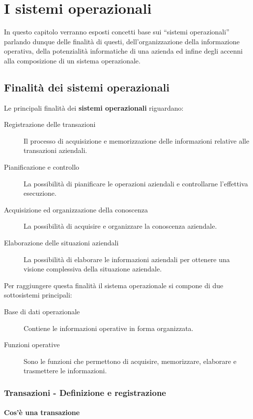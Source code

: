 \chapter{I sistemi operazionali}
\thispagestyle{chapterInit}
\label{ch:operazionali}
In questo capitolo verranno esposti concetti base sui ``sistemi operazionali'' parlando dunque delle finalità di questi, dell'organizzazione della informazione operativa, della potenzialità informatiche di una azienda ed infine degli accenni alla composizione di un sistema operazionale.

\section{Finalità dei sistemi operazionali}
    Le principali finalità dei \textbf{sistemi operazionali} riguardano:
    \begin{description}
        \item[Registrazione delle transazioni] Il processo di acquisizione e memorizzazione delle informazioni relative alle transazioni aziendali.
        \item[Pianificazione e controllo] La possibilità di pianificare le operazioni aziendali e controllarne l'effettiva esecuzione.
        \item[Acquisizione ed organizzazione della conoscenza] La possibilità di acquisire e organizzare la conoscenza aziendale.
        \item[Elaborazione delle situazioni aziendali] La possibilità di elaborare le informazioni aziendali per ottenere una visione complessiva della situazione aziendale.
    \end{description}
    Per raggiungere questa finalità il sistema operazionale si compone di due sottosistemi principali:
    \begin{description}
        \item[Base di dati operazionale] Contiene le informazioni operative in forma organizzata.
        \item[Funzioni operative] Sono le funzioni che permettono di acquisire, memorizzare, elaborare e trasmettere le informazioni.
    \end{description}
    \subsection{Transazioni - Definizione e registrazione}
        \subsubsection{Cos'è una transazione}
